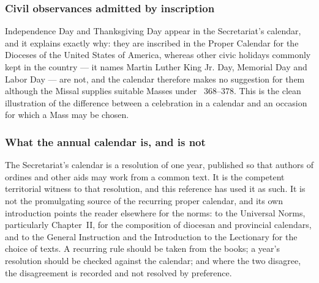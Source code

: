 \subsubsection{Civil observances admitted by inscription}

Independence Day and Thanksgiving Day appear in the Secretariat's calendar, and it explains exactly
why: they are inscribed in the Proper Calendar for the Dioceses of the United States of America,
whereas other civic holidays commonly kept in the country --- it names Martin Luther King Jr. Day,
Memorial Day and Labor Day --- are not, and the calendar therefore makes no suggestion for them
although the Missal supplies suitable Masses under ~368--378. This is the clean
illustration of the difference between a celebration in a calendar and an occasion for which a Mass
may be chosen.

\subsubsection{What the annual calendar is, and is not}

The Secretariat's calendar is a resolution of one year, published so that authors of ordines and
other aids may work from a common text. It is the competent territorial witness to that resolution,
and this reference has used it as such. It is not the promulgating source of the recurring proper
calendar, and its own introduction points the reader elsewhere for the norms: to the Universal Norms,
particularly Chapter~II, for the composition of diocesan and provincial calendars, and to the General
Instruction and the Introduction to the Lectionary for the choice of texts. A recurring rule should
be taken from the books; a year's resolution should be checked against the calendar; and where the
two disagree, the disagreement is recorded and not resolved by preference.
